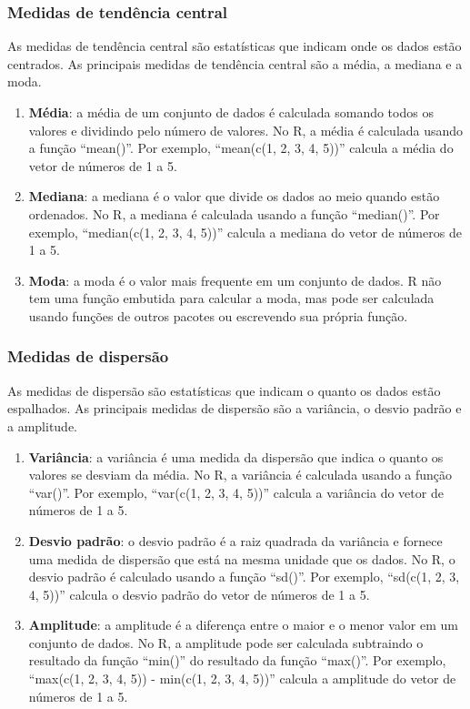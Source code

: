 \documentclass[
]{book}
\begin{document}
\subsubsection{Medidas de tendência central}\label{medidas-de-tenduxeancia-central-1}

As medidas de tendência central são estatísticas que indicam onde os dados estão centrados. As principais medidas de tendência central são a média, a mediana e a moda.

\begin{enumerate}
\def\labelenumi{\arabic{enumi}.}
\item
  \textbf{Média}: a média de um conjunto de dados é calculada somando todos os valores e dividindo pelo número de valores. No R, a média é calculada usando a função ``mean()''. Por exemplo, ``mean(c(1, 2, 3, 4, 5))'' calcula a média do vetor de números de 1 a 5.
\item
  \textbf{Mediana}: a mediana é o valor que divide os dados ao meio quando estão ordenados. No R, a mediana é calculada usando a função ``median()''. Por exemplo, ``median(c(1, 2, 3, 4, 5))'' calcula a mediana do vetor de números de 1 a 5.
\item
  \textbf{Moda}: a moda é o valor mais frequente em um conjunto de dados. R não tem uma função embutida para calcular a moda, mas pode ser calculada usando funções de outros pacotes ou escrevendo sua própria função.
\end{enumerate}

\subsubsection{Medidas de dispersão}\label{medidas-de-dispersuxe3o-1}

As medidas de dispersão são estatísticas que indicam o quanto os dados estão espalhados. As principais medidas de dispersão são a variância, o desvio padrão e a amplitude.

\begin{enumerate}
\def\labelenumi{\arabic{enumi}.}
\item
  \textbf{Variância}: a variância é uma medida da dispersão que indica o quanto os valores se desviam da média. No R, a variância é calculada usando a função ``var()''. Por exemplo, ``var(c(1, 2, 3, 4, 5))'' calcula a variância do vetor de números de 1 a 5.
\item
  \textbf{Desvio padrão}: o desvio padrão é a raiz quadrada da variância e fornece uma medida de dispersão que está na mesma unidade que os dados. No R, o desvio padrão é calculado usando a função ``sd()''. Por exemplo, ``sd(c(1, 2, 3, 4, 5))'' calcula o desvio padrão do vetor de números de 1 a 5.
\item
  \textbf{Amplitude}: a amplitude é a diferença entre o maior e o menor valor em um conjunto de dados. No R, a amplitude pode ser calculada subtraindo o resultado da função ``min()'' do resultado da função ``max()''. Por exemplo, ``max(c(1, 2, 3, 4, 5)) - min(c(1, 2, 3, 4, 5))'' calcula a amplitude do vetor de números de 1 a 5.
\end{enumerate}
\end{document}
